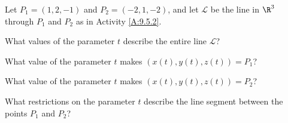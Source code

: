 \begin{activity} \label{A:9.5.5}  Let $P_1 = (1,2,-1)$ and $P_2 = (-2,1,-2)$, and let $\mathcal{L}$ be the line in $\R^3$ through $P_1$ and $P_2$ as in Activity \ref{A:9.5.2}.
	\ba
	\item What values of the parameter $t$ describe the entire line $\mathcal{L}$?
	
	
	
	\item What value of the parameter $t$ makes $(x(t), y(t), z(t)) = P_1$?
	
	
	
	\item What value of the parameter $t$ makes $(x(t), y(t), z(t)) = P_2$?
	
	
	
	\item What restrictions on the parameter $t$ describe the line segment between the points $P_1$ and $P_2$?
	
	
	
	\ea


\end{activity}
\begin{smallhint}

\end{smallhint}
\begin{bighint}

\end{bighint}
\begin{activitySolution}

\end{activitySolution}
\aftera
